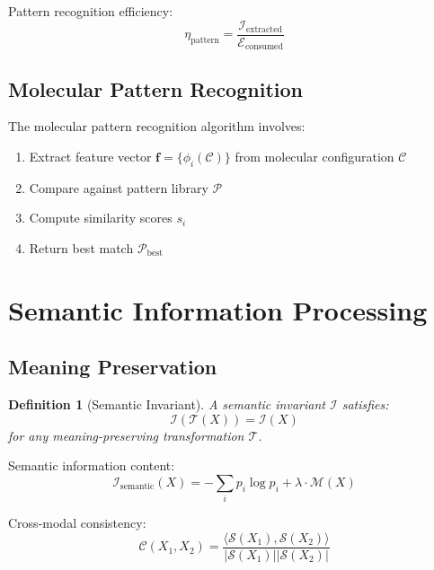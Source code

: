 \documentclass[12pt]{article}
\newtheorem{definition}[theorem]{Definition}
\begin{document}
Pattern recognition efficiency:
\begin{equation}
\eta_{\text{pattern}} = \frac{\mathcal{I}_{\text{extracted}}}{\mathcal{E}_{\text{consumed}}}
\end{equation}

\subsection{Molecular Pattern Recognition}

The molecular pattern recognition algorithm involves:
\begin{enumerate}
\item Extract feature vector $\mathbf{f} = \{\phi_i(\mathcal{C})\}$ from molecular configuration $\mathcal{C}$
\item Compare against pattern library $\mathcal{P}$
\item Compute similarity scores $s_i$
\item Return best match $\mathcal{P}_{\text{best}}$
\end{enumerate}

\section{Semantic Information Processing}

\subsection{Meaning Preservation}

\begin{definition}[Semantic Invariant]
A semantic invariant $\mathcal{I}$ satisfies:
\begin{equation}
\mathcal{I}(\mathcal{T}(X)) = \mathcal{I}(X)
\end{equation}
for any meaning-preserving transformation $\mathcal{T}$.
\end{definition}

Semantic information content:
\begin{equation}
\mathcal{I}_{\text{semantic}}(X) = -\sum_i p_i \log p_i + \lambda \cdot \mathcal{M}(X)
\end{equation}

Cross-modal consistency:
\begin{equation}
\mathcal{C}(X_1, X_2) = \frac{\langle \mathcal{S}(X_1), \mathcal{S}(X_2) \rangle}{|\mathcal{S}(X_1)| |\mathcal{S}(X_2)|}
\end{equation}
\end{document}
